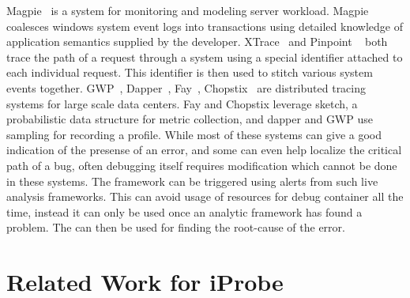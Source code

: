 Magpie~\cite{magpie} is a system for monitoring and modeling server workload.
Magpie coalesces windows system event logs into transactions using detailed knowledge of application semantics supplied by the developer. 
XTrace~\cite{xtrace} and Pinpoint ~\cite{pinpoint} both trace the path of a request through a system using a special identifier attached to each individual request. 
This identifier is then used to stitch various system events together.
GWP~\cite{gwp}, Dapper~\cite{dapper}, Fay~\cite{fay}, Chopstix~\cite{chopstix} are distributed tracing systems for large scale data centers.
Fay and Chopstix leverage sketch, a probabilistic data structure for metric collection, and dapper and GWP use sampling for recording a profile.
While most of these systems can give a good indication of the presense of an error, and some can even help localize the critical path of a bug, often debugging itself requires modification which cannot be done in these systems.
The \parikshan framework can be triggered using alerts from such live analysis frameworks.
This can avoid usage of resources for debug container all the time, instead it can only be used once an analytic framework has found a problem. 
The \debugcontainer can then be used for finding the root-cause of the error.

\section{Related Work for iProbe}



